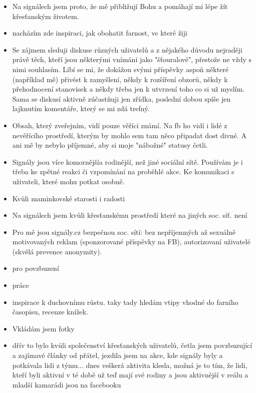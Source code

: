 \documentclass[12pt, a4paper, twoside]{article}
\begin{document}
\begin{itemize}
\item Na signálech jsem proto, že mě přibližují Bohu a pomáhají mi lépe žít křesťanským životem.

\item nacházím zde inspiraci, jak obohatit farnost, ve které žiji

\item Se zájmem sleduji diskuse různých uživatelů a z nějakého důvodu nejraději právě těch, kteří jsou některými vnímáni jako "šťouralové", přestože ne vždy s nimi souhlasím. Líbí se mi, že dokážou svými příspěvky aspoň některé (například mě) přivést k zamyšlení, někdy k rozšíření obzorů, někdy k přehodnocení stanovisek a někdy třeba jen k utvrzení toho co si už myslím. Sama se diskusí aktivně zúčastňuji jen zřídka, poslední dobou spíše jen lajknutím komentáře, který se mi zdá trefný.

\item Obsah, který zveřejním, vidí pouze věřící známí. Na fb ho vidí i lidé z nevěřícího prostředí, kterým by mohlo sem tam něco připadat dost divné. A ani mě by nebylo příjemné, aby si moje "nábožné" statusy četli.

\item Signály jsou více komornějšía  rodinější, než jiné sociální sítě. Používám je i třeba ke zpětné reakci či vzpomínání na proběhlé akce. Ke komunikaci s uživateli, které mohu potkat osobně.

\item Kvůli maminkovské starosti i radosti

\item Na signálech jsem kvůli křesťanskému prostředí které na jiných soc. síť. není

\item Pro mě jsou signály.cz bezpečnou soc. sítí: bez nepříjemných až sexuálně motivovaných reklam (sponzorované příspěvky na FB), autorizovaní uživatelé (skvělá prevence anonymity).

\item pro povzbuzení

\item práce

\item inspirace k duchovnímu růstu. taky tady hledám vtipy vhodné do farního časopisu, recenze knížek.

\item Vkládám jsem fotky

\item dřív to bylo kvůli společenství křesťanských uživatelů, četla jsem povzbuzující a zajímavé články od přátel, jezdila jsem na akce, kde signály byly a potkávala lidi z týmu... dnes veškerá aktivita klesla, možná je to tím, že lidi, kteří byli aktivní v té době už teď mají své rodiny a jsou aktivnější v reálu a mladší kamarádi jsou na facebooku


\end{itemize}
\end{document}
